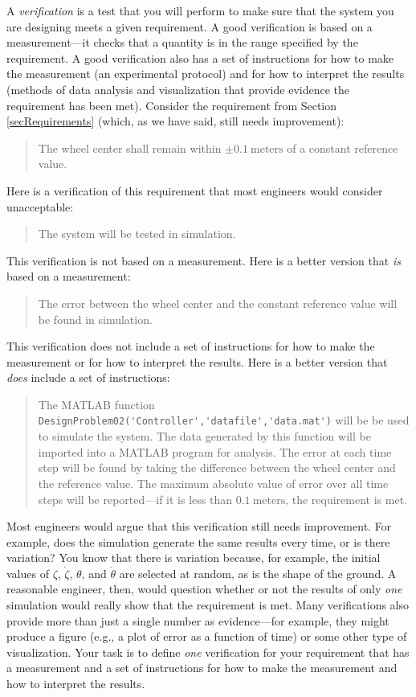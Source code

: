 \documentclass[conf]{new-aiaa}
\begin{document}
A {\em verification} is a test that you will perform to make sure that the system you are designing meets a given requirement. A good verification is based on a measurement---it checks that a quantity is in the range specified by the requirement. A good verification also has a set of instructions for how to make the measurement (an experimental protocol) and for how to interpret the results (methods of data analysis and visualization that provide evidence the requirement has been met). Consider the requirement from Section \ref{secRequirements} (which, as we have said, still needs improvement):
\begin{quote}
The wheel center shall remain within $\pm 0.1~\text{meters}$ of a constant reference value.
\end{quote}
Here is a verification of this requirement that most engineers would consider unacceptable:
\begin{quote}
The system will be tested in simulation.
\end{quote}
This verification is not based on a measurement. Here is a better version that {\em is} based on a measurement:
\begin{quote}
The error between the wheel center and the constant reference value will be found in simulation.
\end{quote}
This verification does not include a set of instructions for how to make the measurement or for how to interpret the results. Here is a better version that {\em does} include a set of instructions:
\begin{quote}
The MATLAB function \lstinline|DesignProblem02('Controller','datafile','data.mat')| will be be used to simulate the system. The data generated by this function will be imported into a MATLAB program for analysis. The error at each time step will be found by taking the difference between the wheel center and the reference value. The maximum absolute value of error over all time steps will be reported---if it is less than $0.1~\text{meters}$, the requirement is met.
\end{quote}
Most engineers would argue that this verification still needs improvement. For example, does the simulation generate the same results every time, or is there variation? You know that there is variation because, for example, the initial values of $\zeta$, $\dot{\zeta}$, $\theta$, and $\dot{\theta}$ are selected at random, as is the shape of the ground. A reasonable engineer, then, would question whether or not the results of only {\em one} simulation would really show that the requirement is met. Many verifications also provide more than just a single number as evidence---for example, they might produce a figure (e.g., a plot of error as a function of time) or some other type of visualization. Your task is to define {\em one} verification for your requirement that has a measurement and a set of instructions for how to make the measurement and how to interpret the results.
\end{document}

